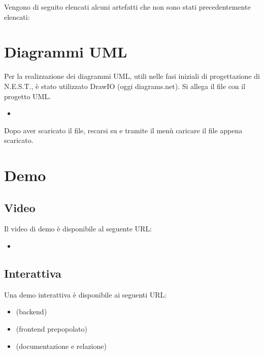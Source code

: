 \documentclass[letterpaper,10pt,italian]{sphinxmanual}
\begin{document}
\sphinxAtStartPar
Vengono di seguito elencati alcuni artefatti che non sono stati precedentemente elencati:


\section{Diagrammi UML}
\label{\detokenize{development/artifacts:diagrammi-uml}}
\sphinxAtStartPar
Per la realizzazione dei diagrammi UML, utili nelle fasi iniziali di progettazione di N.E.S.T., è stato utilizzato
DrawIO (oggi diagrams.net). Si allega il file con il progetto UML.
\begin{itemize}
\item {} 
\sphinxAtStartPar
{}

\end{itemize}

\sphinxAtStartPar
Dopo aver scaricato il file, recarsi su  e tramite il menù 
caricare il file appena scaricato.


\section{Demo}
\label{\detokenize{development/artifacts:demo}}

\subsection{Video}
\label{\detokenize{development/artifacts:video}}
\sphinxAtStartPar
Il video di demo è disponibile al seguente URL:
\begin{itemize}
\item {} 
\sphinxAtStartPar
{}

\end{itemize}


\subsection{Interattiva}
\label{\detokenize{development/artifacts:interattiva}}
\sphinxAtStartPar
Una demo interattiva è disponibile ai seguenti URL:
\begin{itemize}
\item {} 
\sphinxAtStartPar
{} (backend)

\item {} 
\sphinxAtStartPar
{} (frontend pre\sphinxhyphen{}popolato)

\item {} 
\sphinxAtStartPar
{} (documentazione e relazione)

\end{itemize}
\end{document}
